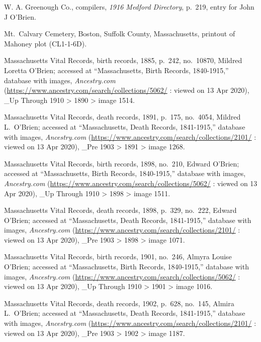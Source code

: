 \begin{thebibliography}{999}
W. A. Greenough Co., compilers, \textit{1916 Medford Directory}, p.\ 219, entry for John J O'Brien.

Mt.\ Calvary Cemetery, Boston, Suffolk County, Massachusetts, printout of Mahoney plot (CL1-1-6D).

Massachusetts Vital Records, birth records, 1885, p.\ 242, no.\ 10870, Mildred Loretta O'Brien; accessed at ``Massachusetts, Birth Records, 1840-1915,'' database with images, \textit{Ancestry.com} (\url{https://www.ancestry.com/search/collections/5062/} : viewed on 13 Apr 2020), \_Up Through 1910 > 1890 > image 1514.

Massachusetts Vital Records, death records, 1891, p.\ 175, no.\ 4054, Mildred L.\ O'Brien; accessed at ``Massachusetts, Death Records, 1841-1915,'' database with images, \textit{Ancestry.com} (\url{https://www.ancestry.com/search/collections/2101/} : viewed on 13 Apr 2020), \_Pre 1903 > 1891 > image 1268.

Massachusetts Vital Records, birth records, 1898, no.\ 210, Edward O'Brien; accessed at ``Massachusetts, Birth Records, 1840-1915,'' database with images, \textit{Ancestry.com} (\url{https://www.ancestry.com/search/collections/5062/} : viewed on 13 Apr 2020), \_Up Through 1910 > 1898 > image 1511.

Massachusetts Vital Records, death records, 1898, p.\ 329, no.\ 222, Edward O'Brien; accessed at ``Massachusetts, Death Records, 1841-1915,'' database with images, \textit{Ancestry.com} (\url{https://www.ancestry.com/search/collections/2101/} : viewed on 13 Apr 2020), \_Pre 1903 > 1898 > image 1071.

Massachusetts Vital Records, birth records, 1901, no.\ 246, Almyra Louise O'Brien; accessed at ``Massachusetts, Birth Records, 1840-1915,'' database with images, \textit{Ancestry.com} (\url{https://www.ancestry.com/search/collections/5062/} : viewed on 13 Apr 2020), \_Up Through 1910 > 1901 > image 1016.

Massachusetts Vital Records, death records, 1902, p.\ 628, no.\ 145, Almira L.\ O'Brien; accessed at ``Massachusetts, Death Records, 1841-1915,'' database with images, \textit{Ancestry.com} (\url{https://www.ancestry.com/search/collections/2101/} : viewed on 13 Apr 2020), \_Pre 1903 > 1902 > image 1187.



\end{thebibliography}
